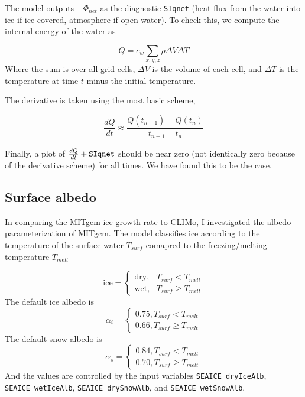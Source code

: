 \documentclass[11pt]{article}
\begin{document}
The model outputs $-\Phi_{net}$ as the diagnostic \verb|SIqnet| (heat flux from the water into ice if ice covered, atmosphere if open water). To check this, we compute the internal energy of the water as

\begin{equation}
Q = c_w \sum_{x, y, z} \rho \Delta V \Delta T
\end{equation}
Where the sum is over all grid cells, $\Delta V$ is the volume of each cell, and $\Delta T$ is the temperature at time $t$ minus the initial temperature.

The derivative is taken using the most basic scheme,

\begin{equation*}
\frac{d Q}{d t} \approx \frac{Q(t_{n+1}) - Q(t_n)}{t_{n+1} - t_n}
\end{equation*}

Finally, a plot of $\frac{d Q}{d t} + \verb|SIqnet|$ should be near zero (not identically zero because of the derivative scheme) for all times. We have found this to be the case.

\subsection{Surface albedo}
In comparing the MITgcm ice growth rate to CLIMo, I investigated the albedo parameterization of MITgcm. The model classifies ice according to the temperature of the surface water $T_{surf}$ comapred to the freezing/melting temperature $T_{melt}$

\begin{equation*}
\textrm{ice} = \begin{cases} \textrm{dry}, & T_{surf} < T_{melt} \\ \textrm{wet}, & T_{surf} \geq T_{melt} \end{cases}
\end{equation*}
The default ice albedo is
\begin{equation*}
\alpha_i = \begin{cases} 0.75, T_{surf} < T_{melt} \\ 0.66, T_{surf} \geq T_{melt} \end{cases}
\end{equation*}
The default snow albedo is
\begin{equation*}
\alpha_s = \begin{cases} 0.84, T_{surf} < T_{melt} \\ 0.70, T_{surf} \geq T_{melt} \end{cases}
\end{equation*}
And the values are controlled by the input variables \verb|SEAICE_dryIceAlb|, \verb|SEAICE_wetIceAlb|, \verb|SEAICE_drySnowAlb|, and \verb|SEAICE_wetSnowAlb|.
\end{document}
